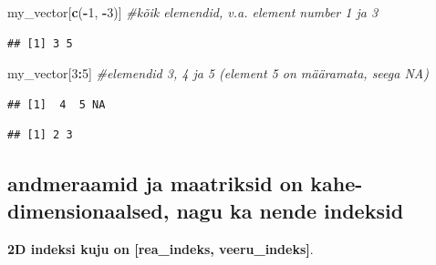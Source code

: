 \documentclass[]{book}
\newenvironment{Shaded}{\begin{snugshade}}{\end{snugshade}}
\newcommand{\KeywordTok}[1]{\textcolor[rgb]{0.13,0.29,0.53}{\textbf{#1}}}
\newcommand{\DecValTok}[1]{\textcolor[rgb]{0.00,0.00,0.81}{#1}}
\newcommand{\CommentTok}[1]{\textcolor[rgb]{0.56,0.35,0.01}{\textit{#1}}}
\newcommand{\OperatorTok}[1]{\textcolor[rgb]{0.81,0.36,0.00}{\textbf{#1}}}
\newcommand{\NormalTok}[1]{#1}
\begin{document}
\begin{Shaded}
\begin{Highlighting}[]
\NormalTok{my_vector[}\KeywordTok{c}\NormalTok{(}\OperatorTok{-}\DecValTok{1}\NormalTok{, }\OperatorTok{-}\DecValTok{3}\NormalTok{)] }\CommentTok{#kõik elemendid, v.a. element number 1 ja 3}
\end{Highlighting}
\end{Shaded}

\begin{verbatim}
## [1] 3 5
\end{verbatim}

\begin{Shaded}
\begin{Highlighting}[]
\NormalTok{my_vector[}\DecValTok{3}\OperatorTok{:}\DecValTok{5}\NormalTok{] }\CommentTok{#elemendid 3, 4 ja 5 (element 5 on määramata, seega NA)}
\end{Highlighting}
\end{Shaded}

\begin{verbatim}
## [1]  4  5 NA
\end{verbatim}

\begin{Shaded}
\end{Shaded}

\begin{verbatim}
## [1] 2 3
\end{verbatim}

\subsection{andmeraamid ja maatriksid on kahe-dimensionaalsed, nagu ka
nende
indeksid}\label{andmeraamid-ja-maatriksid-on-kahe-dimensionaalsed-nagu-ka-nende-indeksid}

\textbf{2D indeksi kuju on {[}rea\_indeks, veeru\_indeks{]}}.
\end{document}
